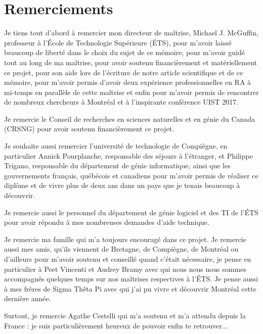 {}
\chapter*{Remerciements}

Je tiens tout d'abord à remercier mon directeur de maîtrise, Michael J. McGuffin, professeur à l'École de Technologie Supérieure (ÉTS), pour m'avoir laissé beaucoup de liberté dans le choix du sujet de ce mémoire, pour m'avoir guidé tout au long de ma maîtrise, pour avoir soutenu financièrement et matériellement ce projet, pour son aide lors de l'écriture de notre article scientifique et de ce mémoire, pour m'avoir permis d'avoir deux expérience professionnelles en RA à mi-temps en parallèle de cette maîtrise et enfin pour m'avoir permis de rencontrer de nombreux chercheurs à Montréal et à l'inspirante conférence UIST 2017.

Je remercie le Conseil de recherches en sciences naturelles et en génie du Canada (CRSNG) pour avoir soutenu financièrement ce projet.

Je souhaite aussi remercier l'université de technologie de Compiègne, en particulier Annick Pourplanche, responsable des séjours à l'étranger, et Philippe Trigano, responsable du département de génie informatique, ainsi que les gouvernements français, québécois et canadiens pour m'avoir permis de réaliser ce diplôme et de vivre plus de deux ans dans un pays que je tenais beaucoup à découvrir.

Je remercie aussi le personnel du département de génie logiciel et des TI de l'ÉTS pour avoir répondu à mes nombreuses demandes d'aide technique.

Je remercie ma famille qui m'a toujours encouragé dans ce projet. Je remercie aussi mes amis, qu'ils viennent de Bretagne, de Compiègne, de Montréal ou d'ailleurs pour m'avoir soutenu et conseillé quand c'était nécessaire, je pense en particulier à Peet Vincenti et Audrey Bramy avec qui nous nous nous sommes accompagnés quelques temps sur nos maîtrises respectives à l'ÉTS. Je pense aussi à mes frères de Sigma Thêta Pi avec qui j'ai pu vivre et découvrir Montréal cette dernière année.

Surtout, je remercie Agathe Cestelli qui m'a soutenu et m'a attendu depuis la France : je suis particulièrement heureux de pouvoir enfin te retrouver...